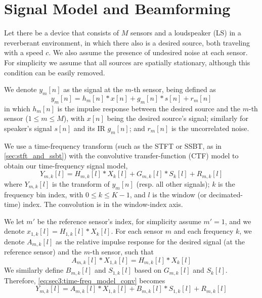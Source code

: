 \section{Signal Model and Beamforming}
\label{sec:signal_model}

Let there be a device that consists of $M$ sensors and a loudspeaker (LS) in a reverberant environment, in which there also is a desired source, both traveling with a speed $c$. We also assume the presence of undesired noise at each sensor. For simplicity we assume that all sources are spatially stationary, although this condition can be easily removed.

We denote $y_m[n]$ as the signal at the $m$-th sensor, being defined as
\begin{equation}
	\label{eq:sec3:time_model_basic}
	y_m[n] = h_m[n] \ast x[n] + g_m[n] \ast s[n] + r_m[n]
\end{equation}
in which $h_m[n]$ is the impulse response between the desired source and the $m$-th sensor ($1 \leq m \leq M$), with $x[n]$ being the desired source's signal; similarly for speaker's signal $s[n]$ and its IR $g_m[n]$; and $r_m[n]$ is the uncorrelated noise.

We use a time-frequency transform (such as the STFT or SSBT, as in \cref{sec:stft_and_ssbt}) with the convolutive transfer-function (CTF) model \cite{talmon_relative_2009} to obtain our time-frequency signal model,
\begin{equation}
	\label{eq:sec3:time-freq_model_conv}
	Y_{m,k}[l] = H_{m,k}[l] \ast X_{k}[l] + G_{m,k}[l] \ast S_{k}[l] + R_{m,k}[l]
\end{equation}
where $Y_{m,k}[l]$ is the transform of $y_m[n]$ (resp. all other signals); $k$ is the frequency bin index, with $0 \leq k \leq K-1$, and $l$ is the window (or decimated-time) index. The convolution is in the window-index axis.

We let $m'$ be the reference sensor's index, for simplicity assume $m' = 1$, and we denote $x_{1,k}[l] = H_{1,k}[l] \ast X_{k}[l]$. For each sensor $m$ and each frequency $k$, we denote $A_{m,k}[l]$ as the relative impulse response for the desired signal (at the reference sensor) and the $m$-th sensor, such that
\begin{equation}
	A_{m,k}[l] \ast X_{1,k}[l] = H_{m,k}[l] \ast X_{k}[l]
\end{equation} 
We similarly define $B_{m,k}[l]$ and $S_{1,k}[l]$ based on $G_{m,k}[l]$ and $S_{k}[l]$. Therefore, \cref{eq:sec3:time-freq_model_conv} becomes
\begin{equation}
	Y_{m,k}[l] = A_{m,k}[l] \ast X_{1,k}[l] + B_{m,k}[l] \ast S_{1,k}[l] + R_{m,k}[l]
\end{equation}

